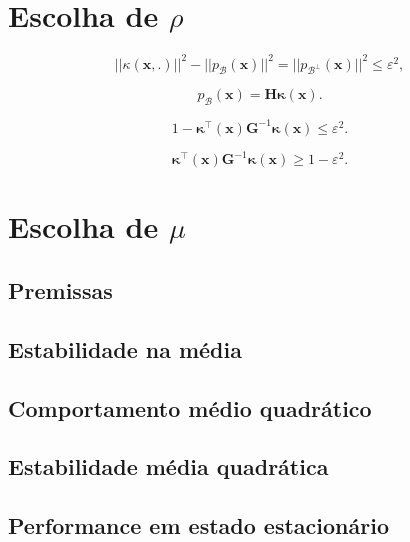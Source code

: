 \section{Escolha de $\rho$}

\begin{equation}
    ||\kappa(\mathbf{x},.)||^2 - ||p_{\mathcal{B}}(\mathbf{x})||^2 = ||p_{\mathcal{B}^\perp}(\mathbf{x})||^2 \leq \varepsilon^2,
\end{equation}

\begin{equation}
    p_{\mathcal{B}}(\mathbf{x}) = \mathbf{H}\boldsymbol{\kappa}(\mathbf{x}).
\end{equation}

\begin{equation}
    1 - \boldsymbol{\kappa}^{\top}(\mathbf{x})\mathbf{G}^{-1}\boldsymbol{\kappa}(\mathbf{x}) \leq \varepsilon^2.
\end{equation}

\begin{equation}
    \boldsymbol{\kappa}^{\top}(\mathbf{x})\mathbf{G}^{-1}\boldsymbol{\kappa}(\mathbf{x}) \geq 1 - \varepsilon^2.
\end{equation}

\section{Escolha de $\mu$}

\subsection{Premissas}

\subsection{Estabilidade na média}

\subsection{Comportamento médio quadrático}

\subsection{Estabilidade média quadrática}

\subsection{Performance em estado estacionário}